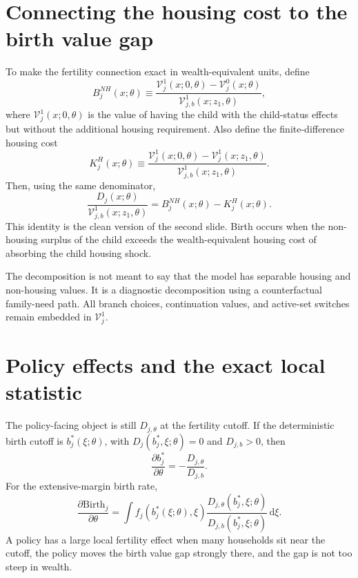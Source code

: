\documentclass[11pt]{article}
\newcommand{\mc}{\mathcal}
\newcommand{\dd}{\mathrm d}
\newcommand{\gap}{D}
\newcommand{\birth}{\mathrm{Birth}}
\theoremstyle{remark}
\begin{document}
\section{Connecting the housing cost to the birth value gap}

To make the fertility connection exact in wealth-equivalent units, define
\begin{equation}
  B^{NH}_j(x;\theta)
  \equiv
  \frac{\mc V^1_j(x;0,\theta)-\mc V^0_j(x;\theta)}{\mc V^1_{j,b}(x;z_1,\theta)},
  \label{eq:BNH_v8}
\end{equation}
where \(\mc V^1_j(x;0,\theta)\) is the value of having the child with the child-status effects but without the additional housing requirement.  Also define the finite-difference housing cost
\begin{equation}
  K^H_j(x;\theta)
  \equiv
  \frac{\mc V^1_j(x;0,\theta)-\mc V^1_j(x;z_1,\theta)}{\mc V^1_{j,b}(x;z_1,\theta)}.
  \label{eq:KH_finite_v8}
\end{equation}
Then, using the same denominator,
\begin{equation}
  \frac{\gap_j(x;\theta)}{\mc V^1_{j,b}(x;z_1,\theta)}
  =B^{NH}_j(x;\theta)-K^H_j(x;\theta).
  \label{eq:D_cash_decomp_v8}
\end{equation}
This identity is the clean version of the second slide.  Birth occurs when the non-housing surplus of the child exceeds the wealth-equivalent housing cost of absorbing the child housing shock.

The decomposition is not meant to say that the model has separable housing and non-housing values.  It is a diagnostic decomposition using a counterfactual family-need path.  All branch choices, continuation values, and active-set switches remain embedded in \(\mc V^1_j\).

\section{Policy effects and the exact local statistic}

The policy-facing object is still \(\gap_{j,\theta}\) at the fertility cutoff.  If the deterministic birth cutoff is \(b_j^*(\xi;\theta)\), with \(\gap_j(b_j^*,\xi;\theta)=0\) and \(\gap_{j,b}>0\), then
\begin{equation}
  \frac{\partial b_j^*}{\partial \theta}
  =-\frac{\gap_{j,\theta}}{\gap_{j,b}}.
\end{equation}
For the extensive-margin birth rate,
\begin{equation}
  \frac{\partial \birth_j}{\partial \theta}
  =
  \int
  f_j(b_j^*(\xi;\theta),\xi)
  \frac{\gap_{j,\theta}(b_j^*,\xi;\theta)}{\gap_{j,b}(b_j^*,\xi;\theta)}
  \,\dd\xi.
  \label{eq:local_policy_v8}
\end{equation}
A policy has a large local fertility effect when many households sit near the cutoff, the policy moves the birth value gap strongly there, and the gap is not too steep in wealth.
\end{document}
